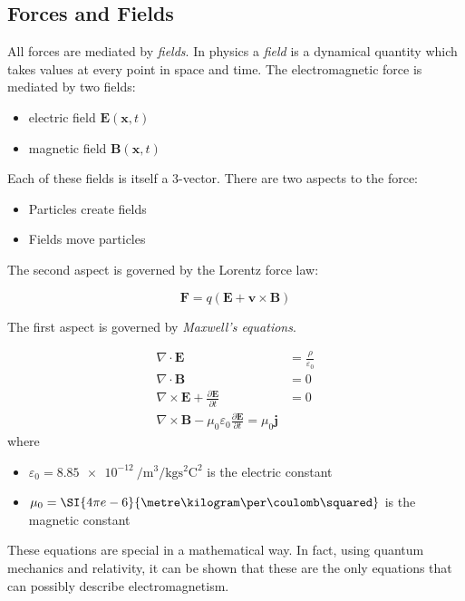 \documentclass[a4paper]{article}
\begin{document}
\subsection{Forces and Fields}
All forces are mediated by \emph{fields}. In physics a \emph{field} is a dynamical quantity which takes values at every point in space and time. The electromagnetic force is mediated by two fields:
\begin{itemize}
  \item electric field $\mathbf{E}(\mathbf{x}, t)$
  \item magnetic field $\mathbf{B}(\mathbf{x}, t)$
\end{itemize}
Each of these fields is itself a 3-vector. There are two aspects to the force:
\begin{itemize}
  \item Particles create fields
  \item Fields move particles
\end{itemize}
The second aspect is governed by the Lorentz force law:
\begin{law}
\[
  \mathbf{F} = q(\mathbf{E} + \mathbf{v}\times \mathbf{B})
\]
\end{law}
The first aspect is governed by \emph{Maxwell's equations}.
\begin{law}
  \begin{align*}
    \nabla \cdot \mathbf{E} &= \frac{\rho}{\varepsilon_0}\\
    \nabla \cdot \mathbf{B} &= 0\\
    \nabla \times \mathbf{E} +\frac{\partial \mathbf{E}}{\partial t} &= 0\\
    \nabla \times \mathbf{B} - \mu_0\varepsilon_0 \frac{\partial \mathbf{E}}{\partial t} = \mu_0 \mathbf{j}
  \end{align*}
  where
  \begin{itemize}
    \item $\varepsilon_0 = \SI{8.85e-12}{\per\metre\cubed\per\kilogram\s\squared\coulomb\squared}$ is the electric constant
    \item $\mu_0 = \SI{4\pi e-6}{\metre\kilogram\per\coulomb\squared}$ is the magnetic constant
  \end{itemize}
\end{law}
These equations are special in a mathematical way. In fact, using quantum mechanics and relativity, it can be shown that these are the only equations that can possibly describe electromagnetism.
\end{document}
